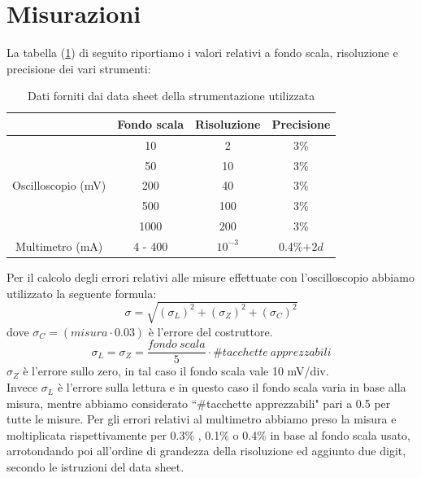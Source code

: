 \documentclass[]{article}
\begin{document}
\section{Misurazioni}
La tabella (\ref{tab:strumenti}) di seguito riportiamo i valori relativi a fondo scala, risoluzione e precisione dei vari strumenti:
	\begin{table}[H]
		\centering
		\begin{tabular}{|c|c|c|c|}
			\cline{2-4}
			\multicolumn{1}{c|}{} & Fondo scala & Risoluzione & Precisione \\
			\hline
			\multirow{5}{*}{Oscilloscopio (mV)} & 10 & 2 & 3\% \\
			\cline{2-4}
			& 50 & 10 & 3\% \\
			\cline{2-4}
			& 200 & 40 & 3\% \\
			\cline{2-4}
			&500 & 100 & 3\% \\
			\cline{2-4}
			&1000 & 200 & 3\% \\
			\hline
			Multimetro (mA) & 4 - 400 & $10^{-3}$ & 0.4\%$+2d$ \\
			\hline
		\end{tabular}
	\label{tab:strumenti}
	\caption{Dati forniti dai data sheet della strumentazione utilizzata}
	\end{table}
Per il calcolo degli errori relativi alle misure effettuate con l'oscilloscopio abbiamo utilizzato la seguente formula:
\begin{equation}
	\sigma=\sqrt{(\sigma_{L})^{2}+(\sigma_{Z})^{2}+(\sigma_{C})^{2}}
\end{equation}
dove $\sigma_{C}= (misura\cdot0.03) $ è l'errore del costruttore. 
\begin{equation*}
	\sigma_{L}=\sigma_{Z}=\frac{fondo \:scala}{5}\cdot\#tacchette \:apprezzabili
\end{equation*}
$ \sigma_{Z} $ è l'errore sullo zero, in tal caso il fondo scala vale 10 mV/div.\\
Invece $ \sigma_{L} $ è l'errore sulla lettura e in questo caso il fondo scala varia in base alla misura, mentre abbiamo considerato ``\#tacchette apprezzabili" pari a 0.5 per tutte le misure.
Per gli errori relativi al multimetro abbiamo preso la misura e moltiplicata rispettivamente per 0.3\% , 0.1\% o 0.4\%  in base al fondo scala usato, arrotondando poi all'ordine di grandezza della risoluzione ed aggiunto due digit, secondo le istruzioni del data sheet.
\end{document}
